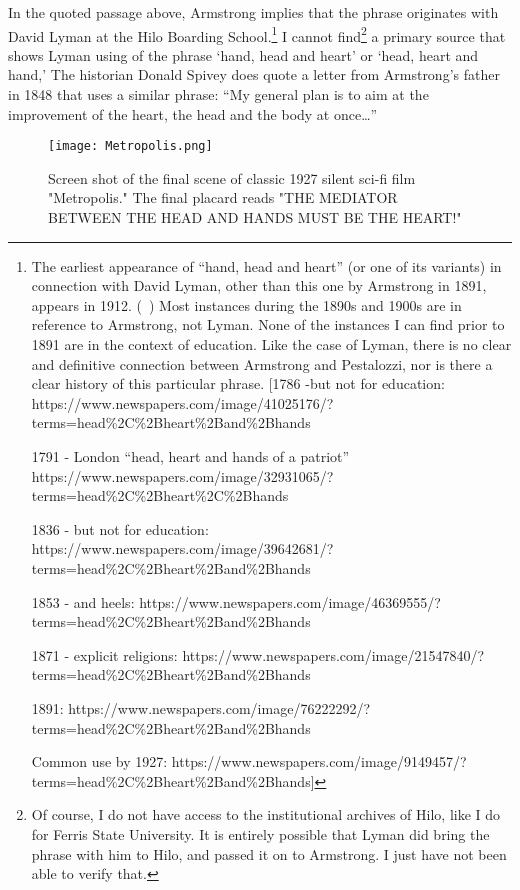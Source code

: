 In the quoted passage above, Armstrong implies that the phrase originates with David Lyman at the Hilo Boarding School.\footnote{The earliest appearance of ``hand, head and heart'' (or one of its variants) in connection with David Lyman, other than this one by Armstrong in 1891, appears in 1912. (~\citep{Oleson:1912wm}) Most instances during the 1890s and 1900s are in reference to Armstrong, not Lyman. None of the instances I can find prior to 1891 are in the context of education. Like the case of Lyman, there is no clear and definitive connection between Armstrong and Pestalozzi, nor is there a clear history of this particular phrase. [1786 -but not for education: https:\slash \slash www.newspapers.com\slash image\slash 41025176\slash ?terms=head\%2C\%2Bheart\%2Band\%2Bhands

1791 - London ``head, heart and hands of a patriot'' https:\slash \slash www.newspapers.com\slash image\slash 32931065\slash ?terms=head\%2C\%2Bheart\%2C\%2Bhands

1836 - but not for education: https:\slash \slash www.newspapers.com\slash image\slash 39642681\slash ?terms=head\%2C\%2Bheart\%2Band\%2Bhands

1853 - and heels: https:\slash \slash www.newspapers.com\slash image\slash 46369555\slash ?terms=head\%2C\%2Bheart\%2Band\%2Bhands

1871 - explicit religions: https:\slash \slash www.newspapers.com\slash image\slash 21547840\slash ?terms=head\%2C\%2Bheart\%2Band\%2Bhands

1891: https:\slash \slash www.newspapers.com\slash image\slash 76222292\slash ?terms=head\%2C\%2Bheart\%2Band\%2Bhands

Common use by 1927: https:\slash \slash www.newspapers.com\slash image\slash 9149457\slash ?terms=head\%2C\%2Bheart\%2Band\%2Bhands]} I cannot find\footnote{Of course, I do not have access to the institutional archives of Hilo, like I do for Ferris State University. It is entirely possible that Lyman did bring the phrase with him to Hilo, and passed it on to Armstrong. I just have not been able to verify that.} a primary source that shows Lyman using of the phrase `hand, head and heart' or `head, heart and hand,' The historian Donald Spivey does quote a letter from Armstrong's father in 1848 that uses a similar phrase: ``My general plan is to aim at the improvement of the heart, the head and the body at once{\ldots}'' ~\citep[p. 18]{Spivey:1978un} \begin{figure*}\texttt{[image: Metropolis.png]}\caption{Screen shot of the final scene of classic 1927 silent sci-fi film "Metropolis." The final placard reads "THE MEDIATOR BETWEEN THE HEAD AND HANDS MUST BE THE HEART!"}\end{figure*}

